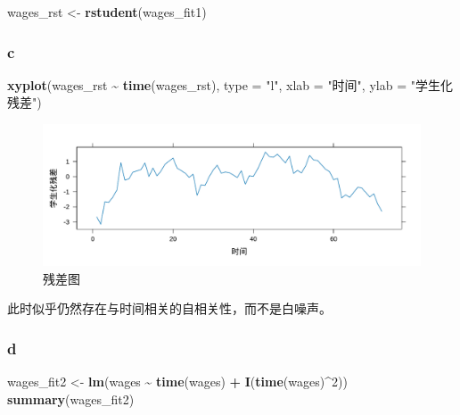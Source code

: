 \documentclass[
]{article}
\newenvironment{Shaded}{\begin{snugshade}}{\end{snugshade}}
\newcommand{\AttributeTok}[1]{\textcolor[rgb]{0.13,0.29,0.53}{#1}}
\newcommand{\DecValTok}[1]{\textcolor[rgb]{0.00,0.00,0.81}{#1}}
\newcommand{\FunctionTok}[1]{\textcolor[rgb]{0.13,0.29,0.53}{\textbf{#1}}}
\newcommand{\NormalTok}[1]{#1}
\newcommand{\OtherTok}[1]{\textcolor[rgb]{0.56,0.35,0.01}{#1}}
\newcommand{\SpecialCharTok}[1]{\textcolor[rgb]{0.81,0.36,0.00}{\textbf{#1}}}
\newcommand{\StringTok}[1]{\textcolor[rgb]{0.31,0.60,0.02}{#1}}
\begin{document}
\begin{Shaded}
\begin{Highlighting}[]
\NormalTok{wages\_rst }\OtherTok{\textless{}{-}} \FunctionTok{rstudent}\NormalTok{(wages\_fit1)}
\end{Highlighting}
\end{Shaded}

\hypertarget{c}{%
\subsubsection*{c}\label{c}}

\begin{Shaded}
\begin{Highlighting}[]
\FunctionTok{xyplot}\NormalTok{(wages\_rst }\SpecialCharTok{\textasciitilde{}} \FunctionTok{time}\NormalTok{(wages\_rst), }\AttributeTok{type =} \StringTok{"l"}\NormalTok{,}
       \AttributeTok{xlab =} \StringTok{"时间"}\NormalTok{, }\AttributeTok{ylab =} \StringTok{"学生化残差"}\NormalTok{)}
\end{Highlighting}
\end{Shaded}

\begin{figure}
\centering
\includegraphics{chapter3_files/figure-latex/wages-resid-1.pdf}
\caption{\label{fig:wages-resid}残差图}
\end{figure}

此时似乎仍然存在与时间相关的自相关性，而不是白噪声。

\hypertarget{d}{%
\subsubsection*{d}\label{d}}

\begin{Shaded}
\begin{Highlighting}[]
\NormalTok{wages\_fit2 }\OtherTok{\textless{}{-}} \FunctionTok{lm}\NormalTok{(wages }\SpecialCharTok{\textasciitilde{}} \FunctionTok{time}\NormalTok{(wages) }\SpecialCharTok{+} \FunctionTok{I}\NormalTok{(}\FunctionTok{time}\NormalTok{(wages)}\SpecialCharTok{\^{}}\DecValTok{2}\NormalTok{))}
\FunctionTok{summary}\NormalTok{(wages\_fit2)}
\end{Highlighting}
\end{Shaded}
\end{document}
